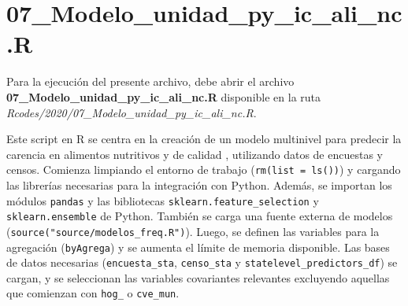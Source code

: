 \documentclass[
  12pt,
]{book}
\newenvironment{Shaded}{\begin{snugshade}}{\end{snugshade}}
\newcommand{\AttributeTok}[1]{\textcolor[rgb]{0.13,0.29,0.53}{#1}}
\newcommand{\CommentTok}[1]{\textcolor[rgb]{0.56,0.35,0.01}{\textit{#1}}}
\newcommand{\DecValTok}[1]{\textcolor[rgb]{0.00,0.00,0.81}{#1}}
\newcommand{\FunctionTok}[1]{\textcolor[rgb]{0.13,0.29,0.53}{\textbf{#1}}}
\newcommand{\NormalTok}[1]{#1}
\newcommand{\OtherTok}[1]{\textcolor[rgb]{0.56,0.35,0.01}{#1}}
\newcommand{\SpecialCharTok}[1]{\textcolor[rgb]{0.81,0.36,0.00}{\textbf{#1}}}
\newcommand{\StringTok}[1]{\textcolor[rgb]{0.31,0.60,0.02}{#1}}
\begin{document}
\begin{Shaded}
\end{Shaded}

\hypertarget{modelo_unidad_py_ic_ali_nc.r}{%
\chapter*{07\_Modelo\_unidad\_py\_ic\_ali\_nc.R}\label{modelo_unidad_py_ic_ali_nc.r}}

Para la ejecución del presente archivo, debe abrir el archivo \textbf{07\_Modelo\_unidad\_py\_ic\_ali\_nc.R} disponible en la ruta \emph{Rcodes/2020/07\_Modelo\_unidad\_py\_ic\_ali\_nc.R}.

Este script en R se centra en la creación de un modelo multinivel para predecir la carencia en alimentos nutritivos y de calidad , utilizando datos de encuestas y censos. Comienza limpiando el entorno de trabajo (\texttt{rm(list\ =\ ls())}) y cargando las librerías necesarias para la integración con Python. Además, se importan los módulos \texttt{pandas} y las bibliotecas \texttt{sklearn.feature\_selection} y \texttt{sklearn.ensemble} de Python. También se carga una fuente externa de modelos (\texttt{source("source/modelos\_freq.R")}). Luego, se definen las variables para la agregación (\texttt{byAgrega}) y se aumenta el límite de memoria disponible. Las bases de datos necesarias (\texttt{encuesta\_sta}, \texttt{censo\_sta} y \texttt{statelevel\_predictors\_df}) se cargan, y se seleccionan las variables covariantes relevantes excluyendo aquellas que comienzan con \texttt{hog\_} o \texttt{cve\_mun}.
\end{document}
